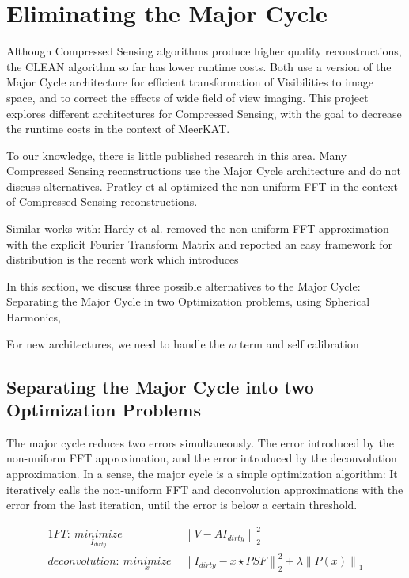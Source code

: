 \section{Eliminating the Major Cycle}\label{killmajor}
Although Compressed Sensing algorithms produce higher quality reconstructions, the CLEAN algorithm so far has lower runtime costs. Both use a version of the Major Cycle architecture for efficient transformation of Visibilities to image space, and to correct the effects of wide field of view imaging. This project explores different architectures for Compressed Sensing, with the goal to decrease the runtime costs in the context of MeerKAT.

To our knowledge, there is little published research in this area. Many Compressed Sensing reconstructions use the Major Cycle architecture\cite{girard2015sparse}\cite{mcewen2011compressed}\cite{pratley2018fast}\cite{dabbech2018cygnus} and do not discuss alternatives. Pratley et al\cite{pratley2017robust} optimized the non-uniform FFT in the context of Compressed Sensing reconstructions. 

Similar works with: Hardy et al.\cite{hardy2013direct} removed the non-uniform FFT approximation with the explicit Fourier Transform Matrix and reported an easy framework for distribution
\cite{dabbech2017wEffect} is the recent work which introduces 

In this section, we discuss three possible alternatives to the Major Cycle: Separating the Major Cycle in two Optimization problems, using Spherical Harmonics,



For new architectures, we need to handle the $w$ term and self calibration




\subsection{Separating the Major Cycle into two Optimization Problems}
The major cycle reduces two errors simultaneously. The error introduced by the non-uniform FFT approximation, and the error introduced by the deconvolution approximation. In a sense, the major cycle is a simple optimization algorithm: It iteratively calls the non-uniform FFT and deconvolution approximations with the error from the last iteration, until the error is below a certain threshold.

\begin{alignat}{1}
FT:\: \underset{I_{dirty}}{minimize} \:& \left \|  V - AI_{dirty} \right \|_2^2\label{killmajor:sep:major}\\
deconvolution:\: \underset{x}{minimize} \:& \left \| I_{dirty} - x \star PSF \right \|_2^2 + \lambda \left \| P(x) \right \|_1 \label{killmajor:sep:deconv}
\end{alignat}


